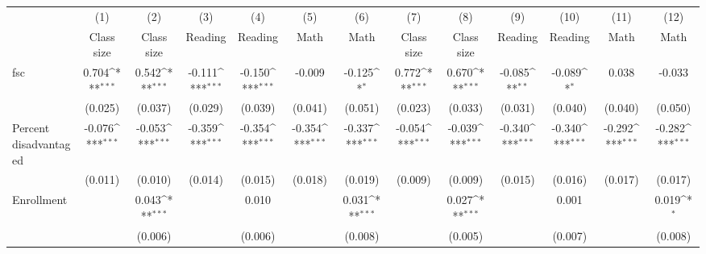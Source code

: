 {
\def\sym#1{\ifmmode^{#1}\else\(^{#1}\)\fi}
\begin{tabular}{l*{12}{c}}
\toprule
            &\multicolumn{1}{c}{(1)}&\multicolumn{1}{c}{(2)}&\multicolumn{1}{c}{(3)}&\multicolumn{1}{c}{(4)}&\multicolumn{1}{c}{(5)}&\multicolumn{1}{c}{(6)}&\multicolumn{1}{c}{(7)}&\multicolumn{1}{c}{(8)}&\multicolumn{1}{c}{(9)}&\multicolumn{1}{c}{(10)}&\multicolumn{1}{c}{(11)}&\multicolumn{1}{c}{(12)}\\
            &\multicolumn{1}{c}{Class size}&\multicolumn{1}{c}{Class size}&\multicolumn{1}{c}{Reading}&\multicolumn{1}{c}{Reading}&\multicolumn{1}{c}{Math}&\multicolumn{1}{c}{Math}&\multicolumn{1}{c}{Class size}&\multicolumn{1}{c}{Class size}&\multicolumn{1}{c}{Reading}&\multicolumn{1}{c}{Reading}&\multicolumn{1}{c}{Math}&\multicolumn{1}{c}{Math}\\
\midrule
fsc         &       0.704\sym{***}&       0.542\sym{***}&      -0.111\sym{***}&      -0.150\sym{***}&      -0.009         &      -0.125\sym{*}  &       0.772\sym{***}&       0.670\sym{***}&      -0.085\sym{**} &      -0.089\sym{*}  &       0.038         &      -0.033         \\
            &     (0.025)         &     (0.037)         &     (0.029)         &     (0.039)         &     (0.041)         &     (0.051)         &     (0.023)         &     (0.033)         &     (0.031)         &     (0.040)         &     (0.040)         &     (0.050)         \\
\addlinespace
Percent disadvantaged&      -0.076\sym{***}&      -0.053\sym{***}&      -0.359\sym{***}&      -0.354\sym{***}&      -0.354\sym{***}&      -0.337\sym{***}&      -0.054\sym{***}&      -0.039\sym{***}&      -0.340\sym{***}&      -0.340\sym{***}&      -0.292\sym{***}&      -0.282\sym{***}\\
            &     (0.011)         &     (0.010)         &     (0.014)         &     (0.015)         &     (0.018)         &     (0.019)         &     (0.009)         &     (0.009)         &     (0.015)         &     (0.016)         &     (0.017)         &     (0.017)         \\
\addlinespace
Enrollment  &                     &       0.043\sym{***}&                     &       0.010         &                     &       0.031\sym{***}&                     &       0.027\sym{***}&                     &       0.001         &                     &       0.019\sym{*}  \\
            &                     &     (0.006)         &                     &     (0.006)         &                     &     (0.008)         &                     &     (0.005)         &                     &     (0.007)         &                     &     (0.008)         \\

\end{tabular}}
